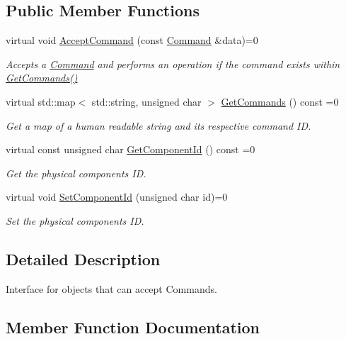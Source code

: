 \subsection*{Public Member Functions}
\begin{DoxyCompactItemize}
\item 
virtual void \hyperlink{classrbp_1_1Commandable_a4a4214731d3e04b5590f805dd5f459f4}{Accept\+Command} (const \hyperlink{classrbp_1_1Command}{Command} \&data)=0
\begin{DoxyCompactList}\small\item\em Accepts a \hyperlink{classrbp_1_1Command}{Command} and performs an operation if the command exists within \hyperlink{classrbp_1_1Commandable_a8e6d397d308b8c075942bc1c8d6d7ca2}{Get\+Commands()} \end{DoxyCompactList}\item 
virtual std\+::map$<$ std\+::string, unsigned char $>$ \hyperlink{classrbp_1_1Commandable_a8e6d397d308b8c075942bc1c8d6d7ca2}{Get\+Commands} () const =0
\begin{DoxyCompactList}\small\item\em Get a map of a human readable string and its respective command I\+D. \end{DoxyCompactList}\item 
virtual const unsigned char \hyperlink{classrbp_1_1Commandable_a9f4e9e2b747133cdf1600f8bb82c4b02}{Get\+Component\+Id} () const =0
\begin{DoxyCompactList}\small\item\em Get the physical component\textquotesingle{}s I\+D. \end{DoxyCompactList}\item 
virtual void \hyperlink{classrbp_1_1Commandable_a19fb2e619697c9b9b77a638747cc4288}{Set\+Component\+Id} (unsigned char id)=0
\begin{DoxyCompactList}\small\item\em Set the physical component\textquotesingle{}s I\+D. \end{DoxyCompactList}\end{DoxyCompactItemize}


\subsection{Detailed Description}
Interface for objects that can accept Commands. 



\subsection{Member Function Documentation}
\hypertarget{classrbp_1_1Commandable_a4a4214731d3e04b5590f805dd5f459f4}{}
